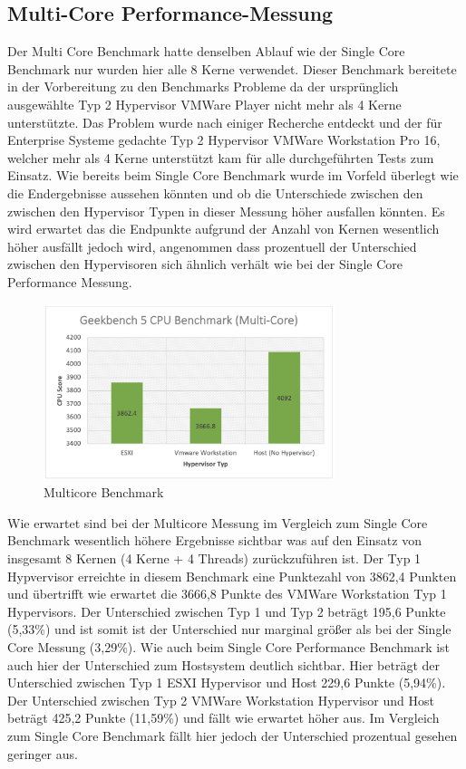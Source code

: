 \documentclass[conference]{IEEEtran}
\begin{document}
\subsection{Multi-Core Performance-Messung}
Der Multi Core Benchmark hatte denselben Ablauf wie der Single Core Benchmark nur wurden hier alle 8 Kerne verwendet. Dieser Benchmark bereitete in der Vorbereitung zu den Benchmarks Probleme da der ursprünglich ausgewählte Typ 2 Hypervisor VMWare Player nicht mehr als 4 Kerne unterstützte. Das Problem wurde nach einiger Recherche entdeckt und der für Enterprise Systeme gedachte Typ 2 Hypervisor VMWare Workstation Pro 16, welcher mehr als 4 Kerne unterstützt kam für alle durchgeführten Tests zum Einsatz.
Wie bereits beim Single Core Benchmark wurde im Vorfeld überlegt wie die Endergebnisse aussehen könnten und ob die Unterschiede zwischen den zwischen den Hypervisor Typen in dieser Messung höher ausfallen könnten. Es wird erwartet das die Endpunkte aufgrund der Anzahl von Kernen wesentlich höher ausfällt jedoch wird, angenommen dass prozentuell der Unterschied zwischen den Hypervisoren sich ähnlich verhält wie bei der Single Core Performance Messung. \newline

\begin{figure}
	\centering
	\includegraphics[keepaspectratio,width=8.5cm,height=0.75\textheight]{multicore.png}
	\caption{Multicore Benchmark}
	\label{architecture}
\end{figure}

Wie erwartet sind bei der Multicore Messung im Vergleich zum Single Core Benchmark wesentlich höhere Ergebnisse sichtbar was auf den Einsatz von insgesamt 8 Kernen (4 Kerne + 4 Threads) zurückzuführen ist. Der Typ 1 Hypvervisor erreichte in diesem Benchmark eine Punktezahl von 3862,4 Punkten und übertrifft wie erwartet die 3666,8 Punkte des VMWare Workstation Typ 1 Hypervisors. Der Unterschied zwischen Typ 1 und Typ 2 beträgt 195,6 Punkte (5,33\%) und ist somit ist der Unterschied nur marginal größer als bei der Single Core Messung (3,29\%). Wie auch beim Single Core Performance Benchmark ist auch hier der Unterschied zum Hostsystem deutlich sichtbar. Hier beträgt der Unterschied zwischen Typ 1 ESXI Hypervisor und Host 229,6 Punkte (5,94\%). Der Unterschied zwischen Typ 2 VMWare Workstation Hypervisor und Host beträgt 425,2 Punkte (11,59\%) und fällt wie erwartet höher aus. Im Vergleich zum Single Core Benchmark fällt hier jedoch der Unterschied prozentual gesehen geringer aus.
\end{document}
